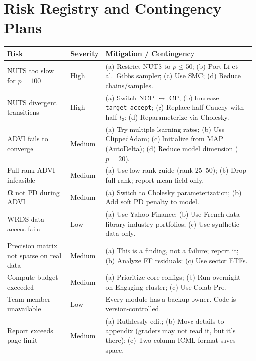 \documentclass[11pt,a4paper]{article}
\newcommand{\bOmega}{\bm{\Omega}}
\begin{document}
\part{Risk Registry and Contingency Plans}

\begin{longtable}{@{}p{}p{}p{}@{}}
\toprule
\textbf{Risk} & \textbf{Severity} & \textbf{Mitigation / Contingency} \\
\midrule
\endhead

NUTS too slow for $p=100$ & High &
(a) Restrict NUTS to $p \leq 50$; (b) Port Li et al.\ Gibbs sampler; (c) Use SMC; (d) Reduce chains/samples. \\[0.5em]

NUTS divergent transitions & High &
(a) Switch NCP $\leftrightarrow$ CP; (b) Increase \texttt{target\_accept}; (c) Replace half-Cauchy with half-$t_3$; (d) Reparameterize via Cholesky. \\[0.5em]

ADVI fails to converge & Medium &
(a) Try multiple learning rates; (b) Use ClippedAdam; (c) Initialize from MAP (AutoDelta); (d) Reduce model dimension ($p=20$). \\[0.5em]

Full-rank ADVI infeasible & Medium &
(a) Use low-rank guide (rank 25--50); (b) Drop full-rank; report mean-field only. \\[0.5em]

$\bOmega$ not PD during ADVI & Medium &
(a) Switch to Cholesky parameterization; (b) Add soft PD penalty to model. \\[0.5em]

WRDS data access fails & Low &
(a) Use Yahoo Finance; (b) Use French data library industry portfolios; (c) Use synthetic data only. \\[0.5em]

Precision matrix not sparse on real data & Medium &
(a) This is a finding, not a failure; report it; (b) Analyze FF residuals; (c) Use sector ETFs. \\[0.5em]

Compute budget exceeded & Medium &
(a) Prioritize core configs; (b) Run overnight on Engaging cluster; (c) Use Colab Pro. \\[0.5em]

Team member unavailable & Low &
Every module has a backup owner. Code is version-controlled. \\[0.5em]

Report exceeds page limit & Medium &
(a) Ruthlessly edit; (b) Move details to appendix (graders may not read it, but it's there); (c) Two-column ICML format saves space. \\[0.5em]

\bottomrule
\end{longtable}
\end{document}
